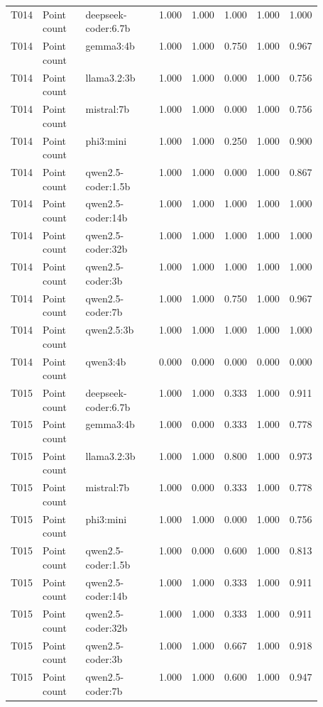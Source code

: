 \begin{longtable}{p{0.08\linewidth}p{0.16\linewidth}p{0.27\linewidth}rrrrr}
T014 & Point count & deepseek-coder:6.7b & 1.000 & 1.000 & 1.000 & 1.000 & 1.000 \\
T014 & Point count & gemma3:4b & 1.000 & 1.000 & 0.750 & 1.000 & 0.967 \\
T014 & Point count & llama3.2:3b & 1.000 & 1.000 & 0.000 & 1.000 & 0.756 \\
T014 & Point count & mistral:7b & 1.000 & 1.000 & 0.000 & 1.000 & 0.756 \\
T014 & Point count & phi3:mini & 1.000 & 1.000 & 0.250 & 1.000 & 0.900 \\
T014 & Point count & qwen2.5-coder:1.5b & 1.000 & 1.000 & 0.000 & 1.000 & 0.867 \\
T014 & Point count & qwen2.5-coder:14b & 1.000 & 1.000 & 1.000 & 1.000 & 1.000 \\
T014 & Point count & qwen2.5-coder:32b & 1.000 & 1.000 & 1.000 & 1.000 & 1.000 \\
T014 & Point count & qwen2.5-coder:3b & 1.000 & 1.000 & 1.000 & 1.000 & 1.000 \\
T014 & Point count & qwen2.5-coder:7b & 1.000 & 1.000 & 0.750 & 1.000 & 0.967 \\
T014 & Point count & qwen2.5:3b & 1.000 & 1.000 & 1.000 & 1.000 & 1.000 \\
T014 & Point count & qwen3:4b & 0.000 & 0.000 & 0.000 & 0.000 & 0.000 \\
T015 & Point count & deepseek-coder:6.7b & 1.000 & 1.000 & 0.333 & 1.000 & 0.911 \\
T015 & Point count & gemma3:4b & 1.000 & 0.000 & 0.333 & 1.000 & 0.778 \\
T015 & Point count & llama3.2:3b & 1.000 & 1.000 & 0.800 & 1.000 & 0.973 \\
T015 & Point count & mistral:7b & 1.000 & 0.000 & 0.333 & 1.000 & 0.778 \\
T015 & Point count & phi3:mini & 1.000 & 1.000 & 0.000 & 1.000 & 0.756 \\
T015 & Point count & qwen2.5-coder:1.5b & 1.000 & 0.000 & 0.600 & 1.000 & 0.813 \\
T015 & Point count & qwen2.5-coder:14b & 1.000 & 1.000 & 0.333 & 1.000 & 0.911 \\
T015 & Point count & qwen2.5-coder:32b & 1.000 & 1.000 & 0.333 & 1.000 & 0.911 \\
T015 & Point count & qwen2.5-coder:3b & 1.000 & 1.000 & 0.667 & 1.000 & 0.918 \\
T015 & Point count & qwen2.5-coder:7b & 1.000 & 1.000 & 0.600 & 1.000 & 0.947 \\

\end{longtable}
